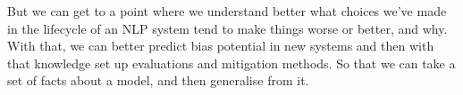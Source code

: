 But we can get to a point where we understand better what choices we've made in the lifecycle of an NLP system tend to make things worse or better, and why. With that, we can better predict bias potential in new systems and then with that knowledge set up evaluations and mitigation methods. So that we can take a set of facts about a model, and then generalise from it. %













